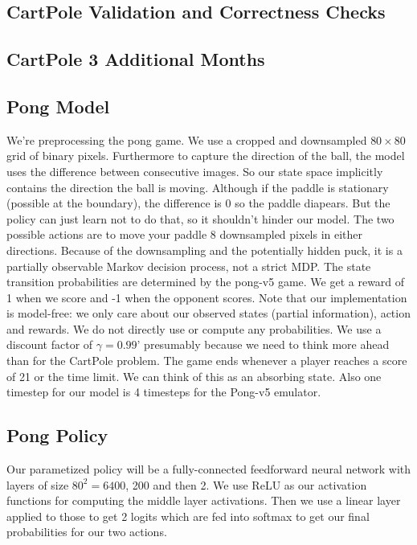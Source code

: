 \documentclass{article}
\begin{document}
\subsection{CartPole Validation and Correctness Checks}

\subsection{CartPole 3 Additional Months}

\subsection{Pong Model}
We're preprocessing the pong game. We use a cropped and downsampled $80\times 80$ grid of binary pixels. Furthermore to capture the direction of the ball, the model uses the difference between consecutive images. So our state space implicitly contains the direction the ball is moving. Although if the paddle is stationary (possible at the boundary), the difference is 0 so the paddle diapears. But the policy can just learn not to do that, so it shouldn't hinder our model. The two possible actions are to move your paddle 8 downsampled pixels in either directions. Because of the downsampling and the potentially hidden puck, it is a partially observable Markov decision process, not a strict MDP. The state transition probabilities are determined by the pong-v5 game. We get a reward of 1 when we score and -1 when the opponent scores. Note that our implementation is model-free: we only care about our observed states (partial information), action and rewards. We do not directly use or compute any probabilities. We use a discount factor of $\gamma = 0.99$'
presumably because we need to think more ahead than for the CartPole problem. The game ends whenever a player reaches a score of 21 or the time limit. We can think of this as an absorbing state. Also one timestep for our model is 4 timesteps for the Pong-v5 emulator.

\subsection{Pong Policy}
Our parametized policy will be a fully-connected feedforward neural network with layers of size $80^2=6400$, 200 and then 2. We use ReLU as our activation functions for computing the middle layer activations. Then we use a linear layer applied to those to get 2 logits which are fed into softmax to get our final probabilities for our two actions.
\end{document}
